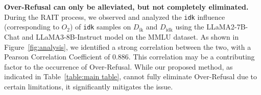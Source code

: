 


\textbf{Over-Refusal can only be alleviated, but not completely eliminated.}
During the RAIT process, we observed and analyzed the \texttt{idk} influence (corresponding to $O_{2}$) of \texttt{idk} samples on $D_{\text{ik}}$ and $D_{\text{idk}}$ using the LLaMA2-7B-Chat and LLaMA3-8B-Instruct model on the MMLU dataset. As shown in Figure~\ref{fig:analysis}, we identified a strong correlation between the two, with a Pearson Correlation Coefficient of 0.886. This correlation may be a contributing factor to the occurrence of Over-Refusal. While our proposed method, as indicated in Table~\ref{table:main table}, cannot fully eliminate Over-Refusal due to certain limitations, it significantly mitigates the issue.

